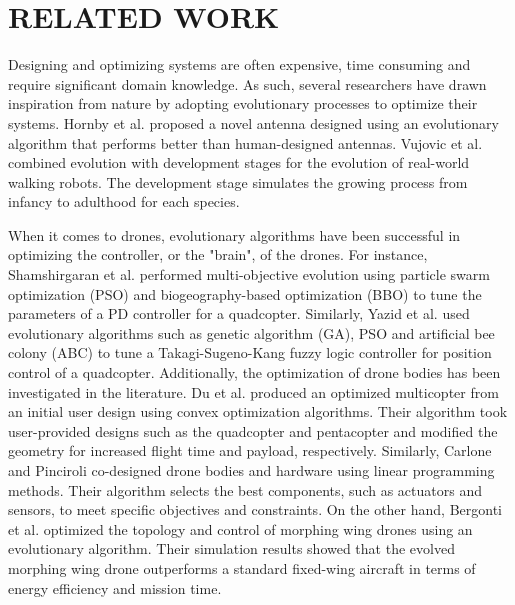 \section{RELATED WORK}
Designing and optimizing systems are often expensive, time consuming and require significant domain knowledge. As such, several researchers have drawn inspiration from nature by adopting evolutionary processes to optimize their systems. Hornby et al. \cite{hornby2011computer} proposed a novel antenna designed using an evolutionary algorithm that performs better than human-designed antennas.
Vujovic et al. \cite{vujovic2017evolutionary} combined evolution with development stages for the evolution of real-world walking robots. The development stage simulates the growing process from infancy to adulthood for each species.

When it comes to drones, evolutionary algorithms have been successful in optimizing the controller, or the "brain", of the drones. For instance, Shamshirgaran et al. \cite{shamshirgaran2021evolutionary} performed multi-objective evolution using particle swarm optimization (PSO) and biogeography-based
optimization (BBO) to tune the parameters of a PD controller for a quadcopter. Similarly, Yazid et al. \cite{yazid2019position} used evolutionary algorithms such as genetic algorithm (GA), PSO and artificial bee colony (ABC) to tune a Takagi-Sugeno-Kang fuzzy logic controller for position control of a quadcopter. Additionally, the optimization of drone bodies has been investigated in the literature.  Du et al. \cite{du2016computational} produced an optimized multicopter from an initial user design using convex optimization algorithms. Their algorithm took user-provided designs such as the quadcopter and pentacopter and modified the geometry for increased flight time and payload, respectively. Similarly, Carlone and Pinciroli \cite{carlone2019robot} co-designed drone bodies and hardware using linear programming methods. Their algorithm selects the best components, such as actuators and sensors, to meet specific objectives and constraints. On the other hand, Bergonti et al. \cite{bergonti2024co} optimized the topology and control of morphing wing drones using an evolutionary algorithm. Their simulation results showed that the evolved morphing wing drone outperforms a standard fixed-wing aircraft in terms of energy efficiency and mission time. 

